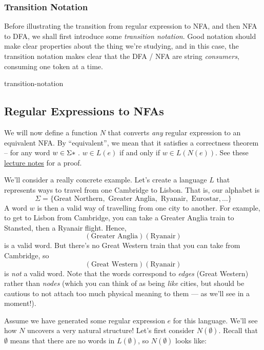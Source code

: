 \subsubsection{Transition Notation}
Before illustrating the transition from regular expression to NFA, and then NFA to DFA, we shall first introduce some \emph{transition notation}. Good notation should make clear properties about the thing we're studying, and in this case, the transition notation makes clear that the DFA / NFA are string \emph{consumers}, consuming one token at a time. 

\begin{center}
    {transition-notation}
\end{center}

\subsection{Regular Expressions to NFAs}
We will now define a function $N$ that converts \textit{any} regular expression to an equivalent NFA. By ``equivalent'', we mean that it satisfies a correctness theorem -- for any word $w \in \Sigma\*$. $w \in L(e)$ if and only if $w \in L(N(e))$. See these \href{https://courses.engr.illinois.edu/cs373/fa2013/Lectures/lec07.pdf}{lecture notes} for a proof.

We'll consider a really concrete example. Let's create a language $L$ that represents ways to travel from one Cambridge to Lisbon. That is, our alphabet is 
\[ \Sigma = \{ \text{Great Northern}, \text{ Greater Anglia}, \text{ Ryanair}, \text{ Eurostar}, \ldots\} \]
A word $w$ is then a valid way of travelling from one city to another. For example, to get to Lisbon from Cambridge, you can take a Greater Anglia train to Stansted, then a Ryanair flight. Hence, 
\[(\text{Greater Anglia})(\text{Ryanair})\]
is a valid word.
But there's no Great Western train that you can take from Cambridge, so 
\[(\text{Great Western})(\text{Ryanair})\]
is \textit{not} a valid word. Note that the words correspond to \emph{edges} (Great Western) rather than \emph{nodes} (which you can think of as being \emph{like} cities, but should be cautious to not attach too much physical meaning to them --- as we'll see in a moment!).

Assume we have generated some regular expression $e$ for this language. We'll see how $N$ uncovers a very natural structure! Let's first consider $N(\emptyset)$. Recall that $\emptyset$ means that there are no words in $L(\emptyset)$, so $N(\emptyset)$ looks like:

